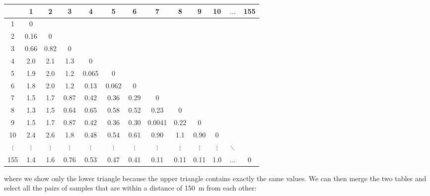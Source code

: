 \begin{center}
\begin{tabular}{c|cccccccccccc}
~ & 1 & 2 & 3 & 4 & 5 & 6 & 7 & 8 & 9 & 10& $\ldots$ & 155\\ \hline
1 & 0 & ~ & ~ & ~ & ~ & ~ & ~ & ~ & ~ & ~ & ~ & ~ \\
2 & 0.16 & 0 & ~ & ~ & ~ & ~ & ~ & ~ & ~ & ~ & ~ & ~ \\
3 & 0.66 & 0.82 & 0 & ~ & ~ & ~ & ~ & ~ & ~ & ~ & ~ & ~ \\
4 & 2.0 & 2.1 & 1.3 & 0 & ~ & ~ & ~ & ~ & ~ & ~ & ~ & ~ \\
5 & 1.9 & 2.0 & 1.2 & 0.065 & 0 & ~ & ~ & ~ & ~ & ~ & ~ & ~ \\
6 & 1.8 & 2.0 & 1.2 & 0.13 & 0.062 & 0 & ~ & ~ & ~ & ~ & ~ & ~ \\
7 & 1.5 & 1.7 & 0.87 & 0.42 & 0.36 & 0.29 & 0 & ~ & ~ & ~ & ~ & ~ \\
8 & 1.3 & 1.5 & 0.64 & 0.65 & 0.58 & 0.52 & 0.23 & 0 & ~ & ~ & ~ & ~ \\
9 & 1.5 & 1.7 & 0.87 & 0.42 & 0.36 & 0.30 & 0.0041 & 0.22 & 0 & ~ & ~ & ~ \\
10& 2.4 & 2.6 & 1.8  & 0.48 & 0.54 & 0.61 & 0.90 & 1.1 & 0.90 & 0 & ~ & ~ \\
$\vdots$ & $\vdots$ & $\vdots$ & $\vdots$ & $\vdots$ & $\vdots$ &
$\vdots$ & $\vdots$ & $\vdots$ & $\vdots$ & $\vdots$ & $\ddots$ & ~ \\
155 & 1.4 & 1.6 & 0.76 & 0.53 & 0.47 & 0.41 & 0.11 & 0.11 & 0.11 & 1.0 & $\ldots$ & 0\\
\end{tabular}
\end{center}

\noindent where we show only the lower triangle because the upper
triangle contains exactly the same values. We can then merge the two
tables and select all the pairs of samples that are within a distance
of 150~m from each other:

